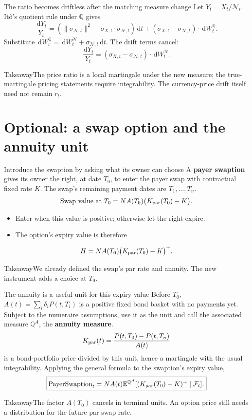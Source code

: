 \documentclass[handout,10pt,t,aspectratio=169]{beamer}
\newenvironment{keybox}{\begin{exampleblock}{Takeaway}}{\end{exampleblock}}
\newcommand{\E}{\mathbb E}
\newcommand{\Q}{\mathbb Q}
\newcommand{\F}{\mathcal F}
\newcommand{\dd}{\,\mathrm d}
\begin{document}
\begin{frame}{The ratio becomes driftless after the matching measure change}
\small
Let \(Y_t=X_t/\mathcal N_t\). It\^o's quotient rule under \(\Q\) gives
\[
 \frac{\dd Y_t}{Y_t}
 =\left(\|\sigma_{\mathcal N,t}\|^2
 -\sigma_{X,t}\cdot\sigma_{\mathcal N,t}\right)\dd t
 +(\sigma_{X,t}-\sigma_{\mathcal N,t})\cdot\dd W_t^\Q.
\]
Substitute \(\dd W_t^\Q=\dd W_t^{\mathcal N}+\sigma_{\mathcal N,t}\dd t\).
The drift terms cancel:
\[
 \boxed{\frac{\dd Y_t}{Y_t}
 =(\sigma_{X,t}-\sigma_{\mathcal N,t})\cdot\dd W_t^{\mathcal N}.}
\]
\begin{keybox}The price ratio is a local martingale under the new measure;
the true-martingale pricing statements require integrability.
The currency-price drift itself need not remain \(r_t\).\end{keybox}
\end{frame}

\section{Optional: a swap option and the annuity unit}

\begin{frame}{Introduce the swaption by asking what its owner can choose}
A \textbf{payer swaption} gives its owner the right, at date \(T_0\),
to enter the payer swap with contractual fixed rate \(K\).
The swap's remaining payment dates are \(T_1,\ldots,T_n\).
\[
 \text{Swap value at }T_0
 =NA(T_0)\big(K_{\rm par}(T_0)-K\big).
\]
\begin{itemize}
\item Enter when this value is positive; otherwise let the right expire.
\item The option's expiry value is therefore
\end{itemize}
\[
 H=NA(T_0)\big(K_{\rm par}(T_0)-K\big)^+.
\]
\begin{keybox}We already defined the swap's par rate and annuity.
The new instrument adds a choice at \(T_0\).\end{keybox}
\end{frame}

\begin{frame}{The annuity is a useful unit for this expiry value}
\small
Before \(T_0\), \(A(t)=\sum_i\delta_iP(t,T_i)\) is a positive fixed bond basket
with no payments yet. Subject to the numeraire assumptions, use it as the unit
and call the associated measure \(\Q^A\), the \textbf{annuity measure}.
\[
 K_{\rm par}(t)=\frac{P(t,T_0)-P(t,T_n)}{A(t)}
\]
is a bond-portfolio price divided by this unit, hence a martingale with the usual integrability.
Applying the general formula to the swaption's expiry value,
\[
 \boxed{\mathrm{PayerSwaption}_t=NA(t)
 \E^{\Q^A}[(K_{\rm par}(T_0)-K)^+\mid\F_t].}
\]
\begin{keybox}The factor \(A(T_0)\) cancels in terminal units.
An option price still needs a distribution for the future par swap rate.\end{keybox}
\end{frame}
\end{document}
